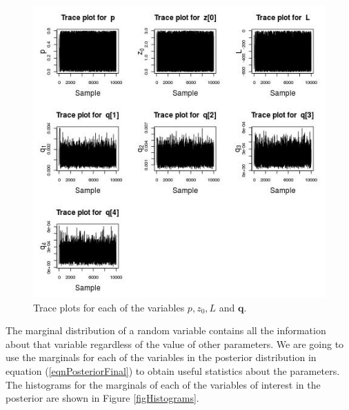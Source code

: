\documentclass[12pt]{book}
\newcommand{\q}{\textbf{q}}
\newcommand{\pars}{p,z_{0},L}
\begin{document}
\begin{figure}[H]
\centering
\includegraphics[scale=0.7]{./FigChap4/traces}
\caption{Trace plots for each of the  variables $\pars$ and $\q$.}
\label{figTraces}
\end{figure}

The marginal distribution of a random variable contains all the information about
that variable regardless of the value of other parameters. We are going
to use the marginals for each of the variables in the posterior distribution
in equation (\ref{eqnPosteriorFinal}) to obtain useful statistics about the 
parameters.
The histograms
for the   marginals  of each of the variables of interest in the posterior are shown
in Figure \ref{figHistograms}. 



\end{document}
